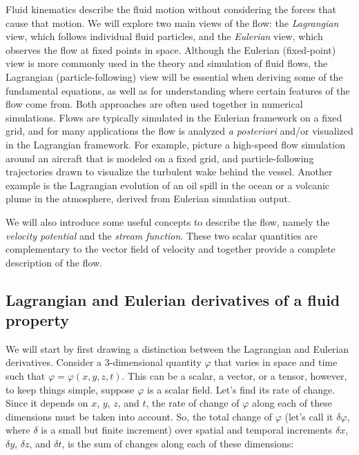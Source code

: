 \documentclass[12pt]{article}
\numberwithin{equation}{section}
\numberwithin{figure}{section}
\numberwithin{table}{section}
\begin{document}
Fluid kinematics describe the fluid motion without considering the forces that
cause that motion.
We will explore two main views of the flow: the \textit{Lagrangian}
view, which follows individual fluid particles, and the \textit{Eulerian}
view, which observes the flow at fixed points in space.
Although the Eulerian (fixed-point) view is more commonly used in the theory and simulation
of fluid flows, the Lagrangian (particle-following) view will be essential when
deriving some of the fundamental equations, as well as for understanding where
certain features of the flow come from.
Both approaches are often used together in numerical simulations.
Flows are typically simulated in the Eulerian framework on a fixed
grid, and for many applications the flow is analyzed \textit{a posteriori}
and/or visualized in the Lagrangian framework.
For example, picture a high-speed flow simulation around an aircraft
that is modeled on a fixed grid, and particle-following trajectories drawn to
visualize the turbulent wake behind the vessel.
Another example is the Lagrangian evolution of an oil spill in the ocean or
a volcanic plume in the atmosphere, derived from Eulerian simulation output.

We will also introduce some useful concepts to describe the flow, namely
the \textit{velocity potential} and the \textit{stream function}.
These two scalar quantities are complementary to the vector field of velocity
and together provide a complete description of the flow.

\subsection{Lagrangian and Eulerian derivatives of a fluid property}

We will start by first drawing a distinction between the Lagrangian and Eulerian
derivatives.
Consider a 3-dimensional quantity $\varphi$ that varies in space and time such
that $\varphi = \varphi(x, y, z, t)$.
This can be a scalar, a vector, or a tensor, however, to keep things simple,
suppose $\varphi$ is a scalar field.
Let's find its rate of change.
Since it depends on $x$, $y$, $z$, and $t$, the rate of change of $\varphi$ along
each of these dimensions must be taken into account.
So, the total change of $\varphi$ (let's call it $\delta\varphi$, where $\delta$
is a small but finite increment) over spatial and temporal increments $\delta x$,
$\delta y$, $\delta z$, and $\delta t$, is the sum of changes along each of
these dimensions:
\end{document}
